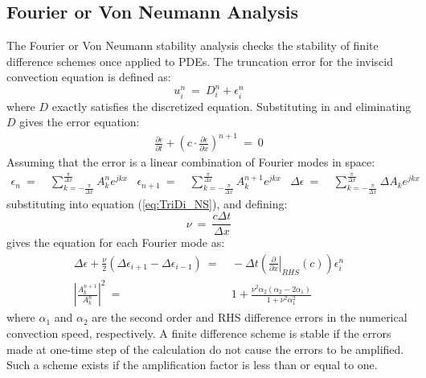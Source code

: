 \documentclass[conf]{new-aiaa}
\begin{document}
\subsection{Fourier or Von Neumann Analysis}
The Fourier or Von Neumann stability analysis checks the stability of finite difference schemes once applied to PDEs. The truncation error for the inviscid convection equation is defined as:
\begin{equation*}
	u_i^n~=~D_i^n+\epsilon_i^n
\end{equation*}
where $D$ exactly satisfies the discretized equation. Substituting in and eliminating $D$ gives the error equation:
\begin{equation}
	\begin{split}
		\label{eq:Implicit_Scheme_Error}
  			\frac{\partial{\epsilon}}{\partial{t}} +\left(c\cdot\frac{\partial{\epsilon}}{\partial{x}}\right)^{n+1}~=~0
	\end{split}
\end{equation}
Assuming that the error is a linear combination of Fourier modes in space: 
\begin{align}
		\label{eq:Error_Fourier}
  			\epsilon_n~=&~\sum_{k=-\frac{\pi}{\Delta{x}}}^{\frac{\pi}{\Delta{x}}}{A_k^n e^{jkx}} & 
  			\epsilon_{n+1}~=&~\sum_{k=-\frac{\pi}{\Delta{x}}}^{\frac{\pi}{\Delta{x}}}{A_k^{n+1} e^{jkx}} &
  			\Delta{\epsilon}~=&~\sum_{k=-\frac{\pi}{\Delta{x}}}^{\frac{\pi}{\Delta{x}}}{\Delta{A_k} e^{jkx}} 
\end{align}
substituting into equation (\ref{eq:TriDi_NS}), and defining:
\begin{equation*}
	\nu~=~\frac{c\Delta{t}}{\Delta{x}}
\end{equation*}
gives the equation for each Fourier mode as:
\begin{equation}
	\begin{split}
		\label{eq:Fourier_Mode_LHS_neq_RHS}
   			\Delta{\epsilon}+\frac{\nu}{2}\left(\Delta{\epsilon_{i+1}}-\Delta{\epsilon_{i-1}} \right)~=&~-\Delta{t}\left(\left.\frac{\partial}{\partial{x}}\right|_{RHS}\left( c \right)\right) {\epsilon}_i^{n} \\
  			\left|\frac{A_k^{n+1}}{A_k^{n}} \right|^2~=&~1+\frac{\nu^2\alpha_2\left(\alpha_2-2\alpha_1\right)}{1+\nu^2\alpha_1^2}
	\end{split}
\end{equation}
where $\alpha_1$ and $\alpha_2$ are the second order and RHS difference errors in the numerical convection speed, respectively. 
A finite difference scheme is stable if the errors made at one-time step of the calculation do not cause the errors to be amplified. 
Such a scheme exists if the amplification factor is less than or equal to one. 
\end{document}
